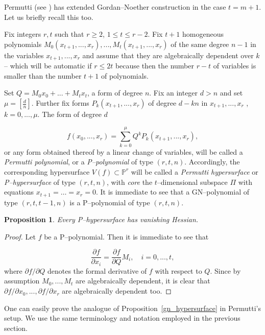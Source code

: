 \documentclass[11pt]{article}   %
\newtheorem{Proposition}[Theorem]{Proposition}
\theoremstyle{definition}
\numberwithin{Theorem}{section} \numberwithin{equation}{section}
\newcommand{\p}{{\mathbb P}}
\begin{document}
{Permutti (see \cite {Permutti3}) has extended Gordan--Noether construction
in the case $t=m+1$. Let us briefly recall this too.

Fix integers $r,t$ such that $r\geq 2$, $1\leq t\leq r-2$. Fix $t+1$
homogeneous polynomials $M_0(x_{t+1},...,x_r),...,
M_t(x_{t+1},...,x_r)$ of the same degree $n-1$ in the variables
$x_{t+1},...,x_r$ and assume that they are algebraically dependent
over $k$ -- which will be automatic if $r\leq 2t$ because then the
number $r-t$ of variables is smaller than the number $t+1$ of
polynomials.

Set $Q=M_0x_0+...+ M_tx_t$, a form of degree $n$. Fix an integer
$d>n$ and set $\mu=[\frac dn]$. Further fix forms
$P_k(x_{t+1},...,x_r)$ of degree $d-kn$ in $x_{t+1},...,x_r$ ,
$k=0,...,\mu$. The form of degree $d$

$$f(x_0,...,x_r)=\sum_{k=0}^ \mu Q^ kP_k(x_{t+1},...,x_r),$$
or any form obtained thereof by a linear change of variables, will
be called a {\it Permutti polynomial}, or a
 {\it {\rm P}--polynomial\/} of type $(r,t,n)$. Accordingly, the corresponding
hypersurface $V(f)\subset\p^r$ will be called a {\it Permutti
hypersurface\/} or {\it {\rm P}--hypersurface\/} of type $(r,t,n)$,
with \emph{core}  the $t$--dimensional subspace $\Pi$ with equations
$x_{t+1}=\dots=x_r=0$. It is immediate to see that a GN--polynomial
of type $(r,t,t-1,n)$ is a P--polynomial of type $(r,t,n)$.

\begin{Proposition} \label{vanhessperm} Every {\rm P}--hypersurface has vanishing
Hessian.  \end{Proposition}

\begin{proof} Let $f$ be a P--polynomial. Then it is immediate to
see that

$$\frac {\partial f}{\partial x_i}=\frac {\partial f}{\partial Q}M_i, \quad
i=0,...,t,$$
 where $\partial f/\partial Q$ denotes the formal derivative of $f$ with respect to $Q$.
 Since by assumption $M_0,...,M_t$ are
algebraically dependent, it is clear that $\partial f/\partial x_0
,...,\partial f/\partial x_r$ are algebraically dependent too.
\end{proof}




One can easily prove the analogue of
Proposition~\ref{gn_hypersurface} in Permutti's setup. We use the
same terminology and notation employed in the previous section.

}
\end{document}
